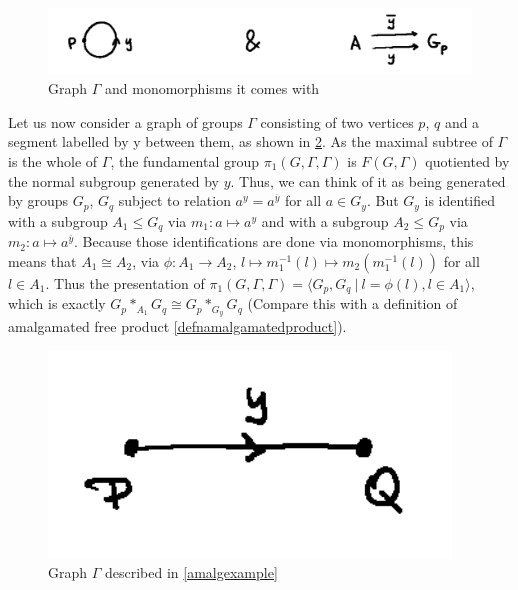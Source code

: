 \begin{figure}[h]
    \centering
    \includegraphics[width=0.5\linewidth]{sections/alicja/HNN loop and monomorphisms.jpeg}
    \caption{Graph $\Gamma$ and monomorphisms it comes with}
    \label{loopHNN}
\end{figure}

\begin{example}\cite[section I.5.1]{serre_trees_1980}\label{amalgexample}
    Let us now consider a graph of groups $\Gamma$ consisting of two vertices $p$, $q$ and a segment labelled by y between them, as shown in \ref{amalggraph}. As the maximal subtree of $\Gamma$ is the whole of $\Gamma$, the fundamental group $\pi_1(G,\Gamma,\Gamma)$ is $F(G,\Gamma)$ quotiented by the normal subgroup generated by $y$. Thus, we can think of it as being generated by groups $G_p$, $G_q$ subject to relation $a^y = a^{\overline{y}}$ for all $a \in G_y$. But $G_y$ is identified with a subgroup $A_1 \le G_q$ via $m_1 : a \mapsto a^y$ and with a subgroup $A_2 \le G_p$ via $m_2: a \mapsto a^{\overline{y}}$. Because those identifications are done via monomorphisms, this means that $A_1 \cong A_2$, via $\phi: A_1 \to A_2$, $l \mapsto m_1^{-1}(l) \mapsto m_2(m_1^{-1}(l))$ for all $l \in A_1$. Thus the presentation of $\pi_1(G,\Gamma,\Gamma) = \langle G_p,G_q \: | \: l = \phi(l), l \in A_1\rangle$, which is exactly $G_p\ast_{A_1}G_q \cong G_p \ast_{G_y}G_q$ (Compare this with a definition of amalgamated free product \ref{defnamalgamatedproduct}).
\end{example}



\begin{figure}[h]
    \centering
    \includegraphics[scale = 0.14]{sections/alicja/Segment of groups.jpeg}
    \caption{Graph $\Gamma$ described in \ref{amalgexample}}
    \label{amalggraph}
\end{figure}

